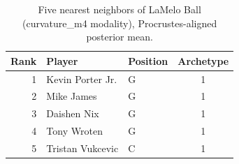 \begin{table}[htbp]
  \centering\small
  \begin{tabular}{rllc}
    \toprule
    Rank & Player & Position & Archetype \\
    \midrule
    1 & Kevin Porter Jr. & G & 1 \\
    2 & Mike James & G & 1 \\
    3 & Daishen Nix & G & 1 \\
    4 & Tony Wroten & G & 1 \\
    5 & Tristan Vukcevic & C & 1 \\
    \bottomrule
  \end{tabular}
  \caption{Five nearest neighbors of LaMelo Ball (curvature_m4 modality), Procrustes-aligned posterior mean.}
  \label{tab:LaMelo_Ball_neighbors_curvature_m4}
\end{table}

